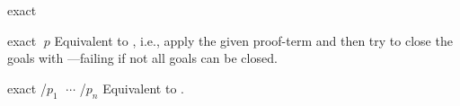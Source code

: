\begin{tactic}{exact}
  \begin{tsyntax}{exact $\;p$}
    Equivalent to , i.e., apply the given
    proof-term and then try to close the goals with
    ---failing if not all goals can be closed.
  \end{tsyntax}

  \begin{tsyntax}{exact /$p_1$ $\;\cdots$ /$p_n$}
    Equivalent to .
  \end{tsyntax}
\end{tactic}
